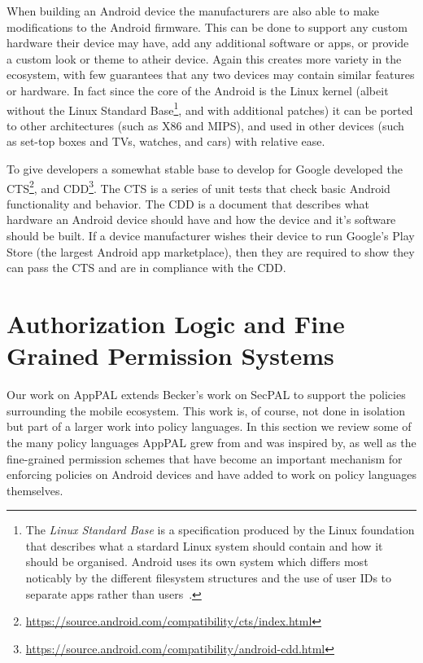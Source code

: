 \documentclass[thesis.tex]{subfiles}
\begin{document}
When building an Android device the manufacturers are also able to make
modifications to the Android firmware. This can be done to support any custom
hardware their device may have, add any additional software or apps, or provide
a custom look or theme to atheir device. Again this creates more variety in the
ecosystem, with few guarantees that any two devices may contain similar features
or hardware. In fact since the core of the Android is the Linux kernel (albeit
without the Linux Standard Base\footnote{The \emph{Linux Standard Base} is a
  specification produced by the Linux foundation that describes what a stardard
  Linux system should contain and how it should be organised. Android uses its own
  system which differs most noticably by the different filesystem structures and
  the use of user IDs to separate apps rather than users~\cite{linux_foundation_lsb_2015}.}, and with additional
patches) it can be ported to other architectures (such as X86 and MIPS), and
used in other devices (such as set-top boxes and TVs, watches, and cars) with
relative ease.

To give developers a somewhat stable base to develop for Google developed the
\ac{CTS}\footnote{\url{https://source.android.com/compatibility/cts/index.html}},
and \ac{CDD}\footnote{\url{https://source.android.com/compatibility/android-cdd.html}}.
The \ac{CTS} is a series of unit tests that check basic Android functionality and
behavior. The \ac{CDD} is a document that describes what hardware an Android device
should have and how the device and it's software should be built. If a device
manufacturer wishes their device to run Google's Play Store (the largest Android
app marketplace), then they are required to show they can pass the \ac{CTS} and are
in compliance with the \ac{CDD}.

\section{Authorization Logic and Fine Grained Permission Systems}
\label{sec:authorization-logic}

Our work on AppPAL extends Becker's work on SecPAL to support the
policies surrounding the mobile ecosystem.  This work is, of course,
not done in isolation but part of a larger work into policy languages.
In this section we review some of the many policy languages AppPAL
grew from and was inspired by, as well as the fine-grained permission
schemes that have become an important mechanism for enforcing policies
on Android devices and have added to work on policy languages
themselves.
\end{document}

